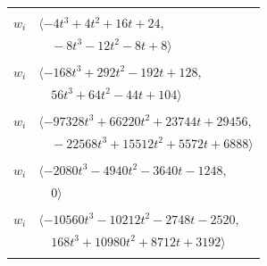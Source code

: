 \documentclass[11pt]{article}
\begin{document}
\begin{longtable}{@{}ll@{}}
\addlinespace[2pt]
\multicolumn{2}{@{}p{0.97\textwidth}@{}}{$i=22$, $D_i=2$, $\rho_{ij}$: $27{:}2, \allowbreak 36{:}1, \allowbreak 37{:}1, \allowbreak 42{:}1, \allowbreak 61{:}1, \allowbreak 70{:}1$}\\
$w_i$ & $\langle -4t^{3}+4t^{2}+16t+24,$\\
 & $\quad -8t^{3}-12t^{2}-8t+8\rangle$\\
\addlinespace[2pt]
\multicolumn{2}{@{}p{0.97\textwidth}@{}}{$i=23$, $D_i=2$, $\rho_{ij}$: $1{:}2, \allowbreak 12{:}2, \allowbreak 13{:}2, \allowbreak 26{:}2, \allowbreak 27{:}1, \allowbreak 34{:}2, \allowbreak 36{:}1, \allowbreak 40{:}1, \allowbreak 46{:}1, \allowbreak 49{:}1$}\\
$w_i$ & $\langle -168t^{3}+292t^{2}-192t+128,$\\
 & $\quad 56t^{3}+64t^{2}-44t+104\rangle$\\
\addlinespace[2pt]
\multicolumn{2}{@{}p{0.97\textwidth}@{}}{$i=24$, $D_i=8$, $\rho_{ij}$: $0{:}2, \allowbreak 5{:}1, \allowbreak 13{:}1, \allowbreak 15{:}2, \allowbreak 26{:}2, \allowbreak 30{:}2, \allowbreak 31{:}2, \allowbreak 39{:}1, \allowbreak 43{:}1, \allowbreak 45{:}2, \allowbreak 48{:}2, \allowbreak 72{:}2$}\\
$w_i$ & $\langle -97328t^{3}+66220t^{2}+23744t+29456,$\\
 & $\quad -22568t^{3}+15512t^{2}+5572t+6888\rangle$\\
\addlinespace[2pt]
\multicolumn{2}{@{}p{0.97\textwidth}@{}}{$i=25$, $D_i=8$, $\rho_{ij}$: $6{:}2, \allowbreak 10{:}1, \allowbreak 29{:}2, \allowbreak 30{:}2, \allowbreak 34{:}2, \allowbreak 35{:}2, \allowbreak 39{:}2, \allowbreak 42{:}2, \allowbreak 49{:}2, \allowbreak 69{:}1$}\\
$w_i$ & $\langle -2080t^{3}-4940t^{2}-3640t-1248,$\\
 & $\quad 0\rangle$\\
\addlinespace[2pt]
\multicolumn{2}{@{}p{0.97\textwidth}@{}}{$i=26$, $D_i=8$, $\rho_{ij}$: $23{:}1, \allowbreak 24{:}1, \allowbreak 30{:}2, \allowbreak 33{:}1, \allowbreak 37{:}2, \allowbreak 42{:}1, \allowbreak 44{:}2, \allowbreak 45{:}1, \allowbreak 55{:}2, \allowbreak 56{:}2, \allowbreak 57{:}2, \allowbreak 62{:}1$}\\
$w_i$ & $\langle -10560t^{3}-10212t^{2}-2748t-2520,$\\
 & $\quad 168t^{3}+10980t^{2}+8712t+3192\rangle$\\
\addlinespace[2pt]
\multicolumn{2}{@{}p{0.97\textwidth}@{}}{$i=27$, $D_i=8$, $\rho_{ij}$: $3{:}2, \allowbreak 22{:}1, \allowbreak 23{:}2, \allowbreak 38{:}1, \allowbreak 45{:}1, \allowbreak 66{:}2, \allowbreak 70{:}2$}\\

\end{longtable}
\end{document}
